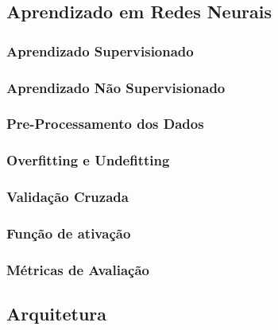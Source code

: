     \subsection{Aprendizado em Redes Neurais}
        \subsubsection{Aprendizado Supervisionado}  

        \subsubsection{Aprendizado Não Supervisionado}
        
        \subsubsection{Pre-Processamento dos Dados}

        \subsubsection{Overfitting e Undefitting}

        \subsubsection{Validação Cruzada}
        \subsubsection{Função de ativação}

        \subsubsection{Métricas de Avaliação}
            
    \subsection{Arquitetura}
